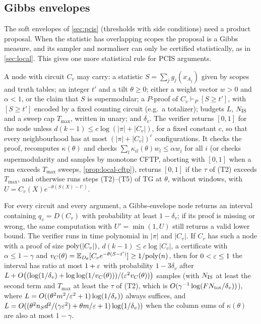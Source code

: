 \subsection{Gibbs envelopes}\label{sec:gibbs}

The soft envelopes of \cref{sec:pcis} (thresholds with side conditions) need a product
proposal. When the statistic has overlapping scopes the proposal is a Gibbs measure, and
its sampler and normaliser can only be certified statistically, as in \cref{sec:local}.
This gives one more statistical rule for PCIS arguments.

\begin{definition}\label{def:gibbs-node}
A node with circuit $C_v$ may carry: a statistic $S=\sum_jg_j(x_{A_j})$ given by scopes and
truth tables; an integer $t'$ and a tilt $\theta\ge0$; either a weight vector $w>0$ and
$\alpha<1$, or the claim that $S$ is supermodular; a $P$-proof of $C_v\vdash_P[S\ge t']$, with
$[S\ge t']$ encoded by a fixed counting circuit (e.g.\ a totalizer); budgets $L$,
$N_{\rm IS}$ and a sweep cap $T_{\max}$, written in unary; and $\delta_v$. The verifier
returns $[0,1]$ for the node unless $d(k-1)\le c\log(|\pi|+|C_v|)$, for a fixed constant
$c$, so that every neighbourhood has at most $(|\pi|+|C_v|)^c$ configurations. It checks
the proof, recomputes $\kappa(\theta)$ and checks
$\sum_l\kappa_{il}(\theta)w_l\le\alpha w_i$ for all $i$ (or checks supermodularity and samples by
monotone CFTP, aborting with $[0,1]$ when a run exceeds $T_{\max}$ sweeps,
\cref{prop:local-cftp}), returns $[0,1]$ if the $\tau$ of (T2) exceeds $T_{\max}$, and
otherwise runs steps (T2)--(T5) of TG at $\theta$, without windows, with
$U=C_v(X)e^{-\theta(S(X)-t')}$.
\end{definition}

\begin{proposition}\label{prop:gibbs}
For every circuit and every argument, a Gibbs-envelope node returns an interval containing
$q_v=D(C_v)$ with probability at least $1-\delta_v$; if its proof is missing or wrong, the
same computation with $U'=\min(1,U)$ still returns a valid lower bound. The verifier runs
in time polynomial in $|\pi|$ and $|C_v|$. If $C_v$ has such a
node with a proof of size $\mathrm{poly}(|C_v|)$, $d(k-1)\le c\log|C_v|$, a certificate with
$\alpha\le1-\gamma$ and
$v_C(\theta)=\mathbb{E}_{D_\theta}[C_ve^{-\theta(S-t')}]\ge1/\mathrm{poly}(n)$, then for $0<\varepsilon\le1$ the interval has
ratio at most $1+\varepsilon$ with probability $1-3\delta_v$ after
$L+O\big((\log(1/\delta_v)+\log\log(1/v_C(\theta)))/(\varepsilon^2v_C(\theta))\big)$ samples (with $N_{\rm IS}$
at least the second term and $T_{\max}$ at least the $\tau$ of (T2), which is
$O(\gamma^{-1}\log(FN_{\rm tot}/\delta_v))$), where $L=O((\theta^2m^2/\varepsilon^2+1)\log(1/\delta_v))$ always suffices,
and $L=O((\theta^2n_Sd^2/(\gamma\varepsilon^2)+\theta m/\varepsilon+1)\log(1/\delta_v))$ when the column sums of
$\kappa(\theta)$ are also at most $1-\gamma$.
\end{proposition}

